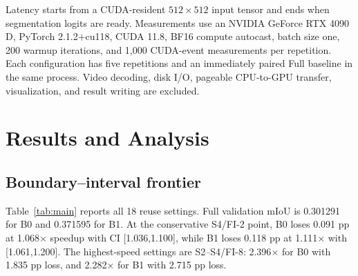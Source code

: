 \documentclass{article}
\begin{document}
Latency starts from a CUDA-resident $512\times512$ input tensor and ends when segmentation logits are ready. Measurements use an NVIDIA GeForce RTX 4090 D, PyTorch 2.1.2+cu118, CUDA 11.8, BF16 compute autocast, batch size one, 200 warmup iterations, and 1,000 CUDA-event measurements per repetition. Each configuration has five repetitions and an immediately paired Full baseline in the same process. Video decoding, disk I/O, pageable CPU-to-GPU transfer, visualization, and result writing are excluded.

\section{Results and Analysis}
\subsection{Boundary--interval frontier}
Table~\ref{tab:main} reports all 18 reuse settings. Full validation mIoU is 0.301291 for B0 and 0.371595 for B1. At the conservative S4/FI-2 point, B0 loses 0.091 pp at 1.068$\times$ speedup with CI [1.036,1.100], while B1 loses 0.118 pp at 1.111$\times$ with [1.061,1.200]. The highest-speed settings are S2--S4/FI-8: 2.396$\times$ for B0 with 1.835 pp loss, and 2.282$\times$ for B1 with 2.715 pp loss.
\end{document}
